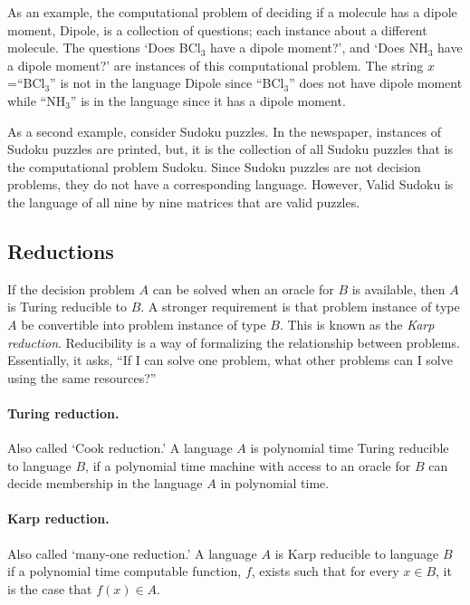 \documentclass[11pt,oneside,final]{huthesis}%
\begin{document}
As an example, the computational problem of deciding if a molecule has a dipole moment, {\sc Dipole}, is a collection of questions; each instance about a different molecule. The questions `Does BCl$_3$ have a dipole moment?', and `Does NH$_3$ have a dipole moment?' are instances of this computational problem. The string $x$=``BCl$_3$'' is not in the language {\sc Dipole} since ``BCl$_3$'' does not have dipole moment while ``NH$_3$'' is in the language since it has a dipole moment. 

As a second example, consider Sudoku puzzles. In the newspaper, instances of Sudoku puzzles are printed, but, it is the collection of all Sudoku puzzles that is the computational problem {\sc Sudoku}.   Since Sudoku puzzles are not decision problems, they do not have a corresponding language. However, {\sc Valid Sudoku} is the language of all nine by nine matrices that are valid puzzles.  

\subsection{Reductions}
If the decision problem $A$ can be solved when an oracle for $B$ is available, then $A$ is Turing reducible to $B$.  A stronger requirement is that problem instance of type $A$ be convertible into problem instance of type $B$.  This is known as the \emph{Karp reduction}.  Reducibility is a way of formalizing the relationship between problems.  Essentially, it asks, ``If I can solve one problem, what other problems can I solve using the same resources?''

\paragraph{Turing reduction.} Also called `Cook reduction.'  A language $A$ is polynomial time Turing reducible to language $B$, if a polynomial time machine with access to an oracle for $B$ can decide membership in the language $A$ in polynomial time.

\paragraph{Karp reduction.} Also called `many-one reduction.'  A language $A$ is Karp reducible to language $B$ if a polynomial time computable function, $f$, exists such that for every $x\in B$, it is the case that $f(x)\in A$.

\paragraph*{}
\end{document}

